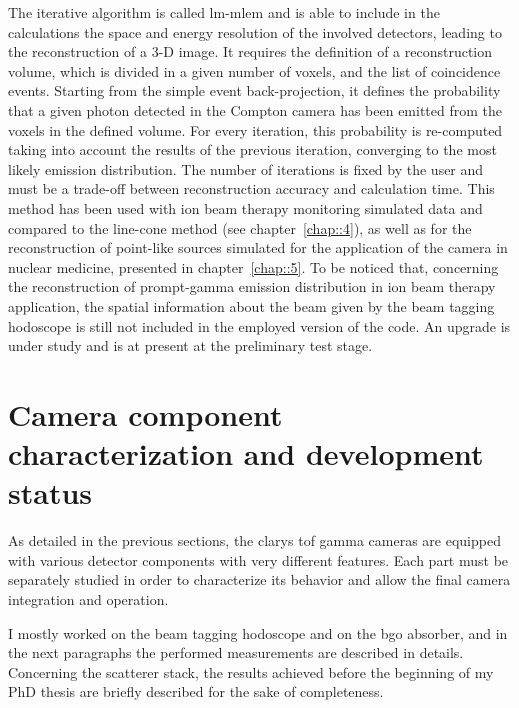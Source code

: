 The iterative algorithm is called \gls{lm-mlem} and is able to include in the calculations the space and energy resolution of the involved detectors, leading to the reconstruction of a 3-D image. It requires the definition of a reconstruction volume, which is divided in a given number of voxels, and the list of coincidence events. Starting from the simple event back-projection, it defines the probability that a given photon detected in the Compton camera has been emitted from the voxels in the defined volume. For every iteration, this probability is re-computed taking into account the results of the previous iteration, converging to the most likely emission distribution. The number of iterations is fixed by the user and must be a trade-off between reconstruction accuracy and calculation time. This method has been used with ion beam therapy monitoring simulated data and compared to the line-cone method (see chapter~\ref{chap::4}), as well as for the reconstruction of point-like sources simulated for the application of the camera in nuclear medicine, presented in chapter~\ref{chap::5}. To be noticed that, concerning the reconstruction of prompt-gamma emission distribution in ion beam therapy application, the spatial information about the beam given by the beam tagging hodoscope is still not included in the employed version of the code. An upgrade is under study and is at present at the preliminary test stage.   
    

\section{Camera component characterization and development status}\label{chap3::sec::charMeasurements}

As detailed in the previous sections, the \gls{clarys} \gls{tof} gamma cameras are equipped with various detector components with very different features. Each part must be separately studied in order to characterize its behavior and allow the final camera integration and operation.

I mostly worked on the beam tagging hodoscope and on the \gls{bgo} absorber, and in the next paragraphs the performed measurements are described in details. Concerning the scatterer stack, the results achieved before the beginning of my PhD thesis are briefly described for the sake of completeness.

